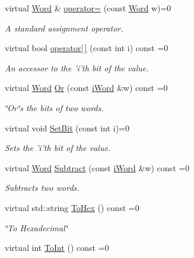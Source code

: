 \begin{DoxyCompactItemize}
virtual \hyperlink{classWord}{Word} \& \hyperlink{classiWord_a56d5d0a8d7e27cf8ef161f8e128ace83}{operator=} (const \hyperlink{classWord}{Word} w)=0
\begin{DoxyCompactList}\small\item\em A standard assignment operator. \item\end{DoxyCompactList}\item 
virtual bool \hyperlink{classiWord_a0e83901b08763247527ce61c89fd847f}{operator\mbox{[}$\,$\mbox{]}} (const int i) const =0
\begin{DoxyCompactList}\small\item\em An accessor to the 'i'th bit of the value. \item\end{DoxyCompactList}\item 
virtual \hyperlink{classWord}{Word} \hyperlink{classiWord_a2f57b8b8739d1ce6c043494696a9f685}{Or} (const \hyperlink{classiWord}{iWord} \&w) const =0
\begin{DoxyCompactList}\small\item\em \char`\"{}Or\char`\"{}s the bits of two words. \item\end{DoxyCompactList}\item 
virtual void \hyperlink{classiWord_adfc0d2e05f06bc51ef29a385a062a435}{SetBit} (const int i)=0
\begin{DoxyCompactList}\small\item\em Sets the 'i'th bit of the value. \item\end{DoxyCompactList}\item 
virtual \hyperlink{classWord}{Word} \hyperlink{classiWord_a8e2da1fb4c3ffcc78e1d94f1798797ec}{Subtract} (const \hyperlink{classiWord}{iWord} \&w) const =0
\begin{DoxyCompactList}\small\item\em Subtracts two words. \item\end{DoxyCompactList}\item 
virtual std::string \hyperlink{classiWord_a7d7cb4facca44fc785899d01e47f29b1}{ToHex} () const =0
\begin{DoxyCompactList}\small\item\em \char`\"{}To Hexadecimal\char`\"{} \item\end{DoxyCompactList}\item 
virtual int \hyperlink{classiWord_adcef1925ad309d54c9a3e896af5d5350}{ToInt} () const =0

\end{DoxyCompactItemize}
